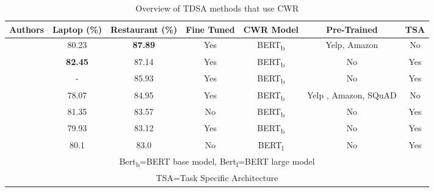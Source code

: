 \begin{table}
\centering
\begin{tabular}{|c|c|c|c|c|c|c|}
\hline
Authors & Laptop (\%) & Restaurant (\%) & Fine Tuned &  CWR Model & Pre-Trained & TSA \\
\hline
\cite{rietzler2019adapt}   & 80.23 &  \textbf{87.89} &  Yes &  BERT\textsubscript{b} & Yelp, Amazon & No \\
\hline
\cite{zeng2019lcf}   & \textbf{82.45} &  87.14 &  Yes &  BERT\textsubscript{b} & No & Yes \\
\hline
\cite{jiang-etal-2019-challenge}   & - &  85.93 &  Yes &  BERT\textsubscript{b} & No & Yes \\
\hline
\cite{xu-etal-2019-bert}   & 78.07 & 84.95  &  Yes &  BERT\textsubscript{b} & Yelp , Amazon, SQuAD & No \\
\hline
\cite{zhao2019modeling}   & 81.35 &  83.57 &  No &  BERT\textsubscript{b} & No & Yes \\
\hline
\cite{song2019attentional}   & 79.93 &  83.12 &  Yes &  BERT\textsubscript{b} & No & Yes \\
\hline
\cite{huang-carley-2019-syntax}   & 80.1 &  83.0 &  No &  BERT\textsubscript{l} & No & Yes \\
\hline
\multicolumn{7}{|c|}{Bert\textsubscript{b}=BERT base model, Bert\textsubscript{l}=BERT large model \citep{devlin-etal-2019-bert}} \\
\multicolumn{7}{|c|}{TSA=Task Specific Architecture} \\
\hline
\end{tabular}
\caption{Overview of TDSA methods that use CWR}
\label{table:aug_cwr_tdsa_cwr_methods_overview}
\end{table}